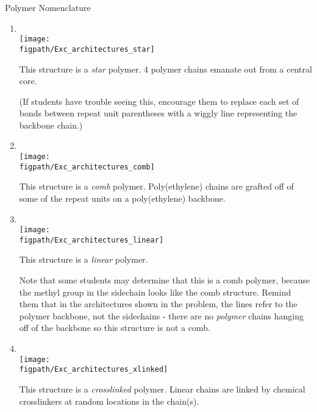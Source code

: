\begin{activity}{Polymer Nomenclature}
\begin{exercises}
		\begin{enumerate}
			\item \text{}\\ \texttt{[image: \\figpath/Exc\_architectures\_star]}
			
				\begin{solution}{}
					This structure is a \emph{star} polymer.  4 polymer chains emanate out from a central core.
					
					(If students have trouble seeing this, encourage them to replace each set of bonds between repeat unit parentheses with a wiggly line representing the backbone chain.)
				\end{solution}
			
			\item \text{}\\ \texttt{[image: \\figpath/Exc\_architectures\_comb]}
			
				\begin{solution}{}
					This structure is a \emph{comb} polymer.  Poly(ethylene) chains are grafted off of some of the repeat units on a poly(ethylene) backbone.
				\end{solution}
			
			\item \text{}\\ \texttt{[image: \\figpath/Exc\_architectures\_linear]}
			
				\begin{solution}{}
					This structure is a \emph{linear} polymer.  
					
					Note that some students may determine that this is a comb polymer, because the methyl group in the sidechain looks like the comb structure.  Remind them that in the architectures shown in the problem, the lines refer to the polymer backbone, not the sidechains - there are no \emph{polymer} chains hanging off of the backbone so this structure is not a comb.
				\end{solution}
			
			\item \text{}\\ \texttt{[image: \\figpath/Exc\_architectures\_xlinked]}
			
				\begin{solution}{}
					This structure is a \emph{crosslinked} polymer.  Linear chains are linked by chemical crosslinkers at random locations in the chain(s).
				\end{solution}
			
		\end{enumerate}
	
\end{exercises}

	
\end{activity}